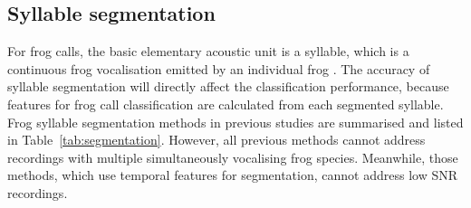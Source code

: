 \subsection{Syllable segmentation}
For frog calls, the basic elementary acoustic unit is a syllable, which is a continuous frog vocalisation emitted by an individual frog \citep{huang2009frog}. The accuracy of syllable segmentation will directly affect the classification performance, because features for frog call classification are calculated from each segmented syllable. Frog syllable segmentation methods in previous studies are summarised and listed in Table~\ref{tab:segmentation}. However, all previous methods cannot address recordings with multiple simultaneously vocalising frog species. Meanwhile, those methods, which use temporal features for segmentation, cannot address low SNR recordings. 


  
\begin{table}[htb!]
\centering
\caption[Summary of related work]{Summary of prior work for frog syllable segmentation. Here, \textit{E} denotes energy, \textit{ZCR} denotes zero-crossing rate. Sequential means that syllables are segmented using the same sequence of those syllables in the recording.}
\label{tab:segmentation}
\end{table}





